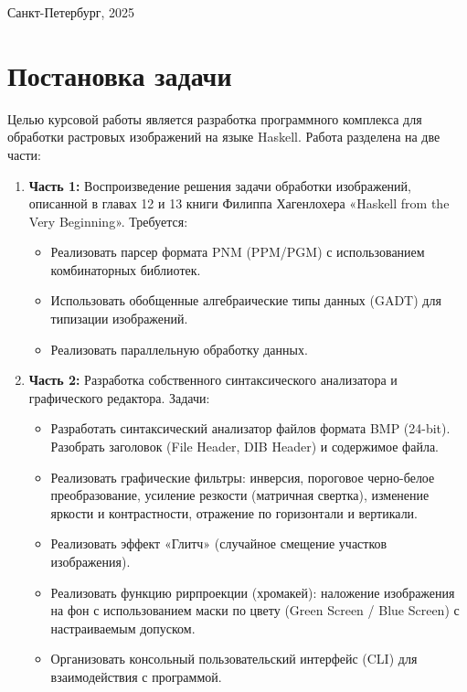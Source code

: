\documentclass[a4paper, final]{article}
\begin{document}
	\hfill \break
	\begin{center} \small{Санкт-Петербург, 2025} \end{center}
	\thispagestyle{empty} 
	
	\newpage
	
	\tableofcontents
		\newpage
	\section {Постановка задачи}
	
	Целью курсовой работы является разработка программного комплекса для обработки растровых изображений на языке Haskell. Работа разделена на две части:
	
	\begin{enumerate}
		\item \textbf{Часть 1:} Воспроизведение решения задачи обработки изображений, описанной в главах 12 и 13 книги Филиппа Хагенлохера «Haskell from the Very Beginning».
		Требуется:
		\begin{itemize}
			\item Реализовать парсер формата PNM (PPM/PGM) с использованием комбинаторных библиотек.
			\item Использовать обобщенные алгебраические типы данных (GADT) для типизации изображений.
			\item Реализовать параллельную обработку данных.
		\end{itemize}
		
		\item \textbf{Часть 2:} Разработка собственного синтаксического анализатора и графического редактора.
		Задачи:
		\begin{itemize}
			\item Разработать синтаксический анализатор файлов формата BMP (24-bit). Разобрать заголовок (File Header, DIB Header) и содержимое файла.
			\item Реализовать графические фильтры: инверсия, пороговое черно-белое преобразование, усиление резкости (матричная свертка), изменение яркости и контрастности, отражение по горизонтали и вертикали.
			\item Реализовать эффект «Глитч» (случайное смещение участков изображения).
			\item Реализовать функцию рирпроекции (хромакей): наложение изображения на фон с использованием маски по цвету (Green Screen / Blue Screen) с настраиваемым допуском.
			\item Организовать консольный пользовательский интерфейс (CLI) для взаимодействия с программой.
		\end{itemize}
	\end{enumerate}
	
\end{document}
